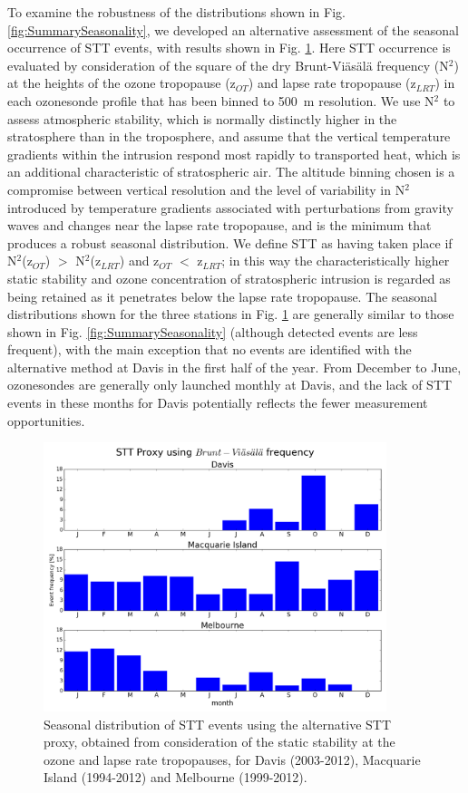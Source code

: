 \documentclass[acp, manuscript]{copernicus} %
\begin{document}
  To examine the robustness of the distributions shown in Fig. \ref{fig:SummarySeasonality}, we developed an alternative assessment of the seasonal occurrence of STT events, with results shown in Fig. \ref{fig:AndrewProxySTT}.
  Here STT occurrence is evaluated by consideration of the square of the dry Brunt-Viäsälä frequency (N$^2$) at the heights of the ozone tropopause (z$_{OT}$) and lapse rate tropopause (z$_{LRT}$) in each ozonesonde profile that has been binned to 500~m resolution.
  We use N$^2$ to assess atmospheric stability, which is normally distinctly higher in the stratosphere than in the troposphere, and assume that the vertical temperature gradients within the intrusion respond most rapidly to transported heat, which is an additional characteristic of stratospheric air.
  The altitude binning chosen is a compromise between vertical resolution and the level of variability in N$^2$ introduced by temperature gradients associated with perturbations from gravity waves and changes near the lapse rate tropopause, and is the minimum that produces a robust seasonal distribution.
  We define STT as having taken place if N$^2$(z$_{OT}$) $>$ N$^2$(z$_{LRT}$) and z$_{OT}$ $<$ z$_{LRT}$; in this way the characteristically higher static stability and ozone concentration of stratospheric intrusion is regarded as being retained as it penetrates below the lapse rate tropopause. 
  The seasonal distributions shown for the three stations in Fig. \ref{fig:AndrewProxySTT} are generally similar to those shown in Fig. \ref{fig:SummarySeasonality} (although detected events are less frequent), with the main exception that no events are identified with the alternative method at Davis in the first half of the year.
  From December to June, ozonesondes are generally only launched monthly at Davis, and the lack of STT events in these months for Davis potentially reflects the fewer measurement opportunities.
  
  \begin{figure}[t]
    \includegraphics[width=10cm]{figures/AndrewProxySTT.png}
    \caption{Seasonal distribution of STT events using the alternative STT proxy, obtained from consideration of the static stability at the ozone and lapse rate tropopauses, for Davis (2003-2012), Macquarie Island (1994-2012) and Melbourne (1999-2012).}
    \label{fig:AndrewProxySTT}
    
  \end{figure}
  
\end{document}

